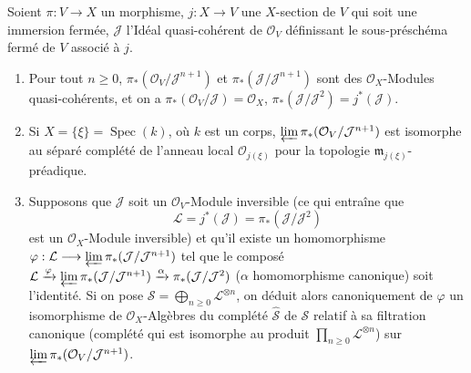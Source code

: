 \begin{lemma}[8.10.1]
\label{II.8.10.1-fr}
Soient $\pi:V\to X$ un morphisme, $j:X\to V$ une $X$-section de $V$ qui soit
une immersion fermée, $\mathcal{J}$ l'Idéal quasi-cohérent de
$\mathcal{O}_V$ définissant le sous-préschéma fermé de $V$ associé à $j$.
\begin{enumerate}
  \item[\rm{(i)}] Pour tout $n\geqslant 0$,
  $\pi_*(\mathcal{O}_V/\mathcal{J}^{n+1})$ et
  $\pi_*(\mathcal{J}/\mathcal{J}^{n+1})$ sont des
  $\mathcal{O}_X$-Modules quasi-cohérents, et on a
  $\pi_*(\mathcal{O}_V/\mathcal{J})=\mathcal{O}_X$,
  $\pi_*(\mathcal{J}/\mathcal{J}^2)=j^*(\mathcal{J})$.
  \item[\rm{(ii)}] Si $X=\{\xi\}=\operatorname{Spec}(k)$, où $k$ est un
  corps, $\varprojlim\pi_*(\mathcal{O}_V/\mathcal{J}^{n+1})$ est isomorphe
  au séparé complété de l'anneau local $\mathcal{O}_{j(\xi)}$ pour la
  topologie $\mathfrak{m}_{j(\xi)}$-préadique.
  \item[\rm{(iii)}] Supposons que $\mathcal{J}$ soit un
  $\mathcal{O}_V$-Module inversible (ce qui entraîne que
  \[
    \mathcal{L}=j^*(\mathcal{J})=
    \pi_*(\mathcal{J}/\mathcal{J}^2)
  \]
  est un $\mathcal{O}_X$-Module inversible) et qu'il existe un homomorphisme
  $\varphi:\mathcal{L}\longrightarrow\varprojlim\pi_*(\mathcal{J}/\mathcal{J}^{n+1})$
  tel que le composé
  $\mathcal{L}\xrightarrow{\varphi}\varprojlim\pi_*(\mathcal{J}/\mathcal{J}^{n+1})\xrightarrow{\alpha}\pi_*(\mathcal{J}/\mathcal{J}^2)$
  ($\alpha$ homomorphisme canonique) soit l'identité. Si on pose
  $\mathcal{S}=\bigoplus_{n\geqslant0}\mathcal{L}^{\otimes n}$, on déduit
  alors canoniquement de $\varphi$ un isomorphisme de
  $\mathcal{O}_X$-Algèbres du complété $\widehat{\mathcal{S}}$ de
  $\mathcal{S}$ relatif à sa filtration canonique (complété qui est isomorphe
  au produit $\prod_{n\geqslant0}\mathcal{L}^{\otimes n}$) sur
  $\varprojlim\pi_*(\mathcal{O}_V/\mathcal{J}^{n+1})$.
\end{enumerate}
\end{lemma}

